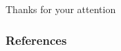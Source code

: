 \documentclass[aspectratio=1610]{beamer}
\begin{document}

\begin{frame}
    \begin{center}
        Thanks for your attention
    \end{center}
\end{frame}

\begin{frame}
    \frametitle{References}
\end{frame}
\end{document}
